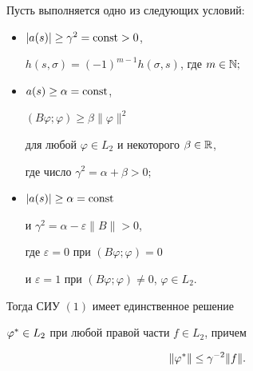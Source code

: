 \begin{thm}


Пусть выполняется одно из следующих условий\/${:}$


\begin{itemize}


\item[I.] $|a(s)|\geq \gamma ^2=\operatorname{const} >0$, 


$h(s,\sigma )=(-1)^{m-1} h(\sigma ,s)$, где $ m\in \Bbb{N};$


\item[II.] $a(s)\geq \alpha =\operatorname{const}$,  


$(B\varphi ;\varphi ) \geq \beta \|\varphi \|^2$


для любой $ \varphi \in L_2 $ и некоторого $ \beta \in \Bbb{R} $,


где число $ \gamma ^2=\alpha +\beta >0;$


\item[III.] $|a(s)|\ge \alpha=\operatorname{const}$


и $\gamma ^2=\alpha -\varepsilon \|B\|>0$,


где $\varepsilon = 0$ при $ (B\varphi; \varphi )=0 $


и $\varepsilon=1$ при $(B\varphi; \varphi )\ne 0$, $\varphi \in L_2$.


\end{itemize}





Тогда СИУ $(1)$ имеет единственное решение


$\varphi^*\in L_2$ при любой правой части $f\in L_2$, причем


\begin{equation}


\|\vp^*\| \lea \gamma^{-2}\|f\|.


\end{equation}


\end{thm}








